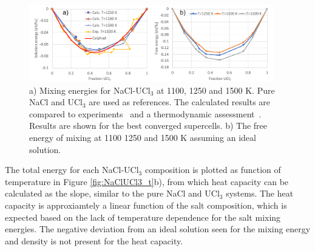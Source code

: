 \documentclass[preprint,3p,10pt,twocolumn,number,sort&compress]{elsarticle}
\begin{document}

\begin{figure}[htb]
\centering
\includegraphics[width=0.95\textwidth]{FIG7.pdf}
\caption{a) Mixing energies for NaCl-UCl$_3$ at 1100, 1250 and 1500 K. Pure NaCl and UCl$_3$ are used as references. The calculated results are compared to experiments~\cite{Matsuura} and a thermodynamic assessment~\cite{YIN2020}.%
 Results are shown for the best converged supercells. b) The free energy of mixing at 1100 1250 and 1500 K assuming an ideal solution.} 
\label{fig:NaClUCl3e}
\end{figure}

The total energy for each NaCl-UCl$_3$ composition is plotted as function of temperature in Figure \ref{fig:NaClUCl3_t}b), from which heat capacity can be calculated as the slope, similar to the pure NaCl and UCl$_3$ systems. The heat capacity is approxiamtely a linear function of the salt composition, which is expected based on the lack of temperature dependence for the salt mixing energies. The negative deviation from an ideal solution seen for the mixing energy and density is not present for the heat capacity. 
\end{document}
